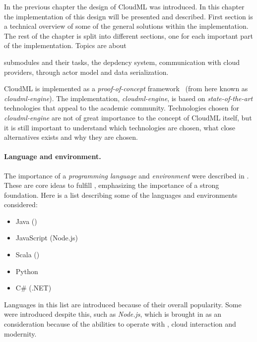
In the previous chapter the design of CloudML was introduced.
In this chapter the implementation of this design will be presented and described.
First section is a technical overview of some of the general solutions within 
the implementation.
The rest of the chapter is split into different sections, one for each important part of the implementation.
Topics are about
\begin{ii}
  \iitem submodules and their tasks,
  \iitem the depdency system,
  \iitem communication with cloud providers,
  \iitem {} through actor model and
  \iitem data serialization.
\end{ii}


CloudML is implemented as a \emph{proof-of-concept} framework~\cite{cloudml-engine}
(from here known as \emph{cloudml-engine}). 
The implementation, \emph{cloudml-engine}, 
is based on \emph{state-of-the-art} technologies that appeal to the academic community.
Technologies chosen for \emph{cloudml-engine} are not of great importance to the concept of CloudML itself,
but it is still important to understand which technologies are chosen, what close alternatives exists
and why they are chosen.

\paragraph{Language and environment.} 

The importance of a \emph{programming language} and \emph{environment} were
described in .
These are core ideas to fulfill , emphasizing the importance of a strong foundation.
Here is a list describing some of the languages and environments considered:
\begin{itemize}
  \item Java ()
  \item JavaScript (Node.js)
  \item Scala ()
  \item Python
  \item C\# (.NET)
\end{itemize}
Languages in this list are introduced because of their overall popularity.
Some were introduced despite this, such as \emph{Node.js}, 
which is brought in as an consideration because of the abilities to operate
with , cloud interaction and modernity.

